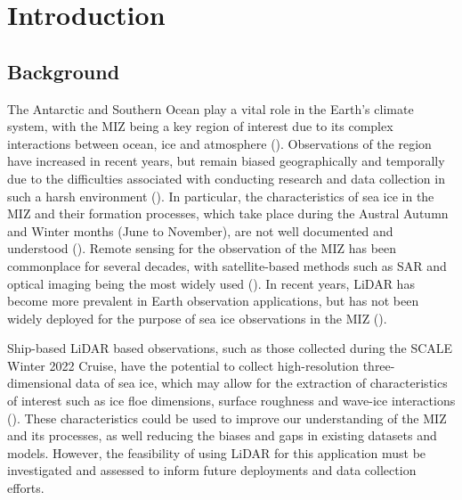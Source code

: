 \chapter{Introduction}
\label{ch:ch1.introduction}
\section{Background}
\label{sec:ch1.background}

The Antarctic and Southern Ocean play a vital role in the Earth's climate system, with the \ac{MIZ} being a key region of interest due to its complex interactions between ocean, ice and atmosphere (\cite{eayrsUnderstandingSeasonalCycle2019}). Observations of the region have increased in recent years, but remain biased geographically and temporally due to the difficulties associated with conducting research and data collection in such a harsh environment (\cite{comisoSatelliteRemoteSensing1991}). In particular, the characteristics of sea ice in the \ac{MIZ} and their formation processes, which take place during the Austral Autumn and Winter months (June to November), are not well documented and understood (\cite{vichiIndicatorSeaIce2022}). Remote sensing for the observation of the \ac{MIZ} has been commonplace for several decades, with satellite-based methods such as \ac{SAR} and optical imaging being the most widely used (\cite{maslanikRemoteSensingAntarctica1990}). In recent years, \ac{LiDAR} has become more prevalent in Earth observation applications, but has not been widely deployed for the purpose of sea ice observations in the \ac{MIZ} (\cite{pettorelliSatelliteRemoteSensing2014}).

Ship-based \ac{LiDAR} based observations, such as those collected during the \ac{SCALE} Winter 2022 Cruise, have the potential to collect high-resolution three-dimensional data of sea ice, which may allow for the extraction of characteristics of interest such as ice floe dimensions, surface roughness and wave-ice interactions (\cite{sandruShipborneSeaiceField2021}). These characteristics could be used to improve our understanding of the \ac{MIZ} and its processes, as well reducing the biases and gaps in existing datasets and models. However, the feasibility of using \ac{LiDAR} for this application must be investigated and assessed to inform future deployments and data collection efforts.

